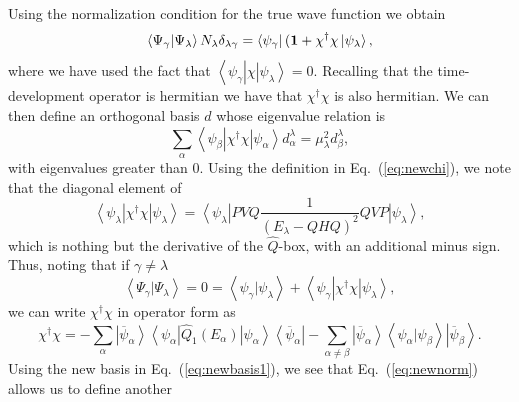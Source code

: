 \documentclass{article}
\begin{document}
Using the normalization condition for the true wave function
we obtain
\begin{equation}
  \left\langle \Psi_{\gamma} |\Psi_{\lambda}\right\rangle
  N_{\lambda}\delta_{\lambda\gamma}=
  \left\langle \psi_{\gamma}\right |({\bf 1} +
   \chi^{\dagger}\chi\left | \psi_{\lambda}\right\rangle,
  \label{eq:newnorm}
\end{equation}
where we have used the fact that
$\left\langle \psi_{\gamma}\right |
\chi\left | \psi_{\lambda}\right\rangle=0$. Recalling that the
time-development operator is hermitian we have that $\chi^{\dagger}\chi$ is
also hermitian. We can then define an orthogonal basis $d$ whose eigenvalue
relation is
\begin{equation}
   \sum_{\alpha}\left\langle \psi_{\beta}\right | \chi^{\dagger}
   \chi\left | \psi_{\alpha}
   \right\rangle d_{\alpha}^{\lambda}=\mu^{2}_{\lambda}
   d_{\beta}^{\lambda},
   \label{eq:newbasis1}
\end{equation}
with eigenvalues greater than $0$.
Using the definition in Eq.\ (\ref{eq:newchi}), we note
that the diagonal element of
\begin{equation}
   \left\langle \psi_{\lambda}\right | \chi^{\dagger}
   \chi\left | \psi_{\lambda}\right\rangle=
   \left\langle \psi_{\lambda}\right | PVQ\frac{1}{(E_{\lambda}-QHQ)^2}QVP
   \left | \psi_{\lambda}\right\rangle,
   \label{eq:chichi}
\end{equation}
which is nothing but the derivative of the $\hat{Q}$-box, with an additional
minus sign. Thus, noting that if $\gamma\neq\lambda$
\begin{equation}
  \left\langle \Psi_{\gamma} |\Psi_{\lambda}\right\rangle=0=
    \left\langle \psi_{\gamma} |\psi_{\lambda}\right\rangle
   +\left\langle \psi_{\gamma}\right |
    \chi^{\dagger}\chi\left | \psi_{\lambda}\right\rangle,
\end{equation}
we can write $\chi^{\dagger}\chi$
in operator form as
\begin{equation}
   \chi^{\dagger}\chi =-\sum_{\alpha}\left |
    \overline{\psi}_{\alpha}\right\rangle
   \left\langle \psi_{\alpha}\right |
    \hat{Q}_1(E_{\alpha})\left | \psi_{\alpha}\right\rangle
   \left\langle \overline{\psi}_{\alpha} \right |
   -\sum_{\alpha\neq\beta}\left | \overline{\psi}_{\alpha}\right\rangle
    \left\langle \psi_{\alpha} |\psi_{\beta}\right\rangle
   \left | \overline{\psi}_{\beta}\right\rangle.
\end{equation}
Using the new basis in Eq.\ (\ref{eq:newbasis1}), we see that
Eq.\ (\ref{eq:newnorm}) allows us to define another
\end{document}
